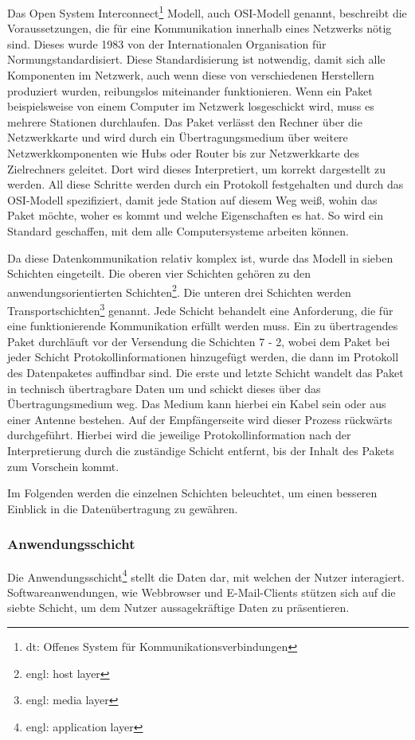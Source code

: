 \documentclass[12pt]{article}
\begin{document}
	Das Open System Interconnect\footnote{dt: Offenes System für Kommunikationsverbindungen} Modell, auch OSI-Modell genannt, beschreibt die Voraussetzungen, die für eine Kommunikation innerhalb eines Netzwerks nötig sind. Dieses wurde 1983 von der \glq Internationalen Organisation für Normung\grq standardisiert. Diese Standardisierung ist notwendig, damit sich alle Komponenten im Netzwerk, auch wenn diese von verschiedenen Herstellern produziert wurden, reibungslos miteinander funktionieren. Wenn ein Paket beispielsweise von einem Computer im Netzwerk losgeschickt wird, muss es mehrere Stationen durchlaufen. Das Paket verlässt den Rechner über die Netzwerkkarte und wird durch ein Übertragungsmedium über weitere Netzwerkkomponenten wie Hubs oder Router bis zur Netzwerkkarte des Zielrechners geleitet. Dort wird dieses Interpretiert, um korrekt dargestellt zu werden. All diese Schritte werden durch ein Protokoll festgehalten und durch das OSI-Modell spezifiziert, damit jede Station auf diesem Weg weiß, wohin das Paket möchte, woher es kommt und welche Eigenschaften es hat. So wird ein Standard geschaffen, mit dem alle Computersysteme arbeiten können.
	
	Da diese  Datenkommunikation relativ komplex ist, wurde das Modell in sieben Schichten eingeteilt. Die oberen vier Schichten gehören zu den anwendungsorientierten Schichten\footnote{engl: host layer}. Die unteren drei Schichten werden Transportschichten\footnote{engl: media layer} genannt. Jede Schicht behandelt eine Anforderung, die für eine funktionierende Kommunikation erfüllt werden muss. Ein zu übertragendes Paket durchläuft vor der Versendung die Schichten 7 - 2, wobei dem Paket bei jeder Schicht Protokollinformationen hinzugefügt werden, die dann im Protokoll des Datenpaketes auffindbar sind. Die erste und letzte Schicht wandelt das Paket in technisch übertragbare Daten um und schickt dieses über das Übertragungsmedium weg. Das Medium kann hierbei ein Kabel sein oder aus einer Antenne bestehen. Auf der Empfängerseite wird dieser Prozess rückwärts durchgeführt. Hierbei wird die jeweilige Protokollinformation nach der Interpretierung durch die zuständige Schicht entfernt, bis der Inhalt des Pakets zum Vorschein kommt.
	
	Im Folgenden werden die einzelnen Schichten beleuchtet, um einen besseren Einblick in die Datenübertragung zu gewähren.

\subsubsection{Anwendungsschicht}
	Die Anwendungsschicht\footnote{engl: application layer} stellt die Daten dar, mit welchen der Nutzer interagiert. Softwareanwendungen, wie Webbrowser und E-Mail-Clients stützen sich auf die siebte Schicht, um dem Nutzer aussagekräftige Daten zu präsentieren. 
	
\end{document}
